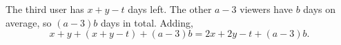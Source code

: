 The third user has $x+y-t$ days left. The other $a-3$ viewers have $b$ days on average, so $(a-3)b$ days in total. Adding,
\[x+y+(x+y-t)+(a-3)b=\boxed{2x+2y-t+(a-3)b}.\]
